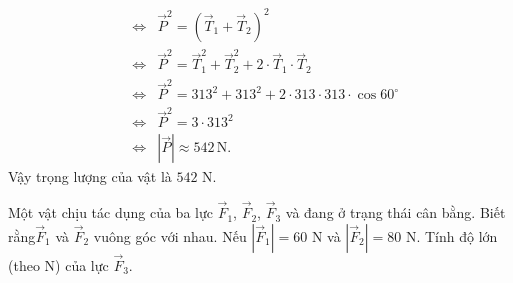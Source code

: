 \begin{ex}
{\begin{eqnarray*}
		&\Leftrightarrow& \overrightarrow{P}^2=\left(\overrightarrow{T}_1+\overrightarrow{T}_2\right)^2\\
		&\Leftrightarrow&  \overrightarrow{P}^2=\overrightarrow{T}_1^2+\overrightarrow{T}_2^2+2\cdot\overrightarrow{T}_1\cdot\overrightarrow{T}_2\\
		&\Leftrightarrow& \overrightarrow{P}^2=313^2+313^2+2\cdot313\cdot 313\cdot\cos60^\circ\\
		&\Leftrightarrow& \overrightarrow{P}^2=3\cdot313^2\\
		&\Leftrightarrow& \left|\overrightarrow{P}\right|\approx 542 \,\text{N}.
	\end{eqnarray*}
	Vậy trọng lượng của vật là $542$ N.
	}
\end{ex}
\begin{ex}%
	Một vật chịu tác dụng của ba lực $\overrightarrow{F}_1$, $\overrightarrow{F}_2$, $\overrightarrow{F}_3$ và đang ở trạng thái cân bằng. Biết rằng$\overrightarrow{F}_1$ và $\overrightarrow{F}_2$ vuông góc với nhau. Nếu $\left|\overrightarrow{F}_1\right|=60$ N và $\left|\overrightarrow{F}_2\right|=80$ N. Tính độ lớn (theo N) của lực $\overrightarrow{F}_3$.
\end{ex}
 
\setcounter{ex}{0}
